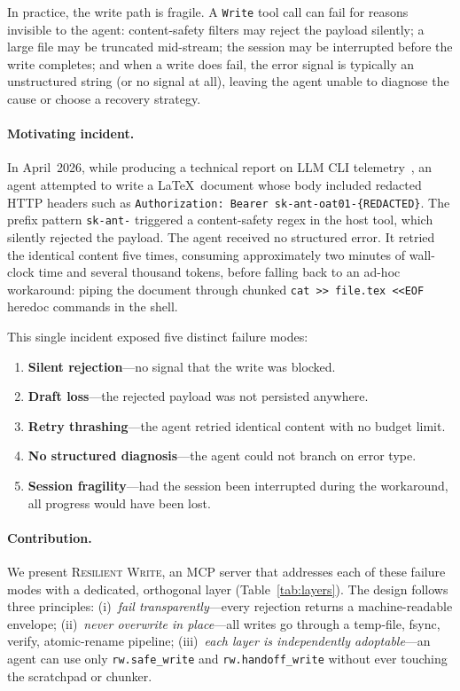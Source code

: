\documentclass[11pt,twocolumn]{article}
\begin{document}
In practice, the write path is fragile.  A \texttt{Write} tool call
can fail for reasons invisible to the agent: content-safety filters
may reject the payload silently; a large file may be truncated
mid-stream; the session may be interrupted before the write
completes; and when a write does fail, the error signal is
typically an unstructured string (or no signal at all), leaving the
agent unable to diagnose the cause or choose a recovery strategy.

\paragraph{Motivating incident.}
In April~2026, while producing a technical report on LLM CLI
telemetry~\cite{luxferro2026telemetry}, an agent attempted to write
a \LaTeX\ document whose body included redacted HTTP headers such
as \texttt{Authorization:\ Bearer\ sk-ant-oat01-\{REDACTED\}}.
The prefix pattern \texttt{sk-ant-} triggered a content-safety
regex in the host tool, which silently rejected the payload.
The agent received no structured error.  It retried the identical
content five times, consuming approximately two minutes of
wall-clock time and several thousand tokens, before falling back to
an ad-hoc workaround: piping the document through chunked
\texttt{cat~>>~file.tex~<<EOF} heredoc commands in the shell.

This single incident exposed five distinct failure modes:
\begin{enumerate}[nosep]
  \item \textbf{Silent rejection}---no signal that the write was blocked.
  \item \textbf{Draft loss}---the rejected payload was not persisted anywhere.
  \item \textbf{Retry thrashing}---the agent retried identical content with no budget limit.
  \item \textbf{No structured diagnosis}---the agent could not branch on error type.
  \item \textbf{Session fragility}---had the session been interrupted during the workaround, all progress would have been lost.
\end{enumerate}

\paragraph{Contribution.}
We present \textsc{Resilient Write}, an MCP server that addresses
each of these failure modes with a dedicated, orthogonal layer
(Table~\ref{tab:layers}).  The design follows three principles:
(i)~\emph{fail transparently}---every rejection returns a
machine-readable envelope;
(ii)~\emph{never overwrite in place}---all writes go through a
temp-file, fsync, verify, atomic-rename pipeline;
(iii)~\emph{each layer is independently adoptable}---an agent can
use only \texttt{rw.safe\_write} and \texttt{rw.handoff\_write}
without ever touching the scratchpad or chunker.
\end{document}
